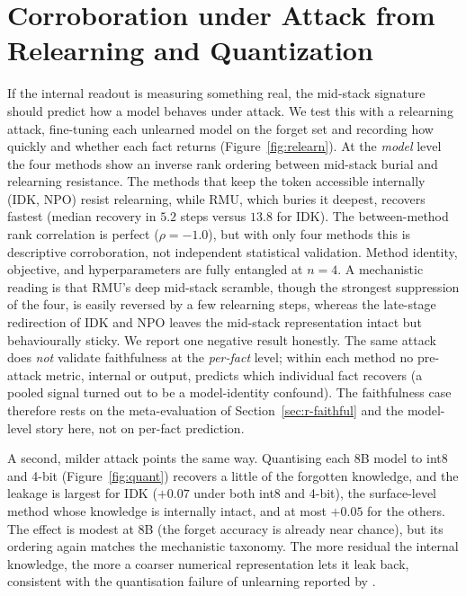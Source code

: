 \section{Corroboration under Attack from Relearning and Quantization}
\label{sec:r-attacks}

If the internal readout is measuring something real, the mid-stack signature should predict how a model
behaves under attack. We test this with a relearning attack, fine-tuning each unlearned model on the forget
set and recording how quickly and whether each fact returns (Figure~\ref{fig:relearn}). At the
\emph{model} level the four methods show an inverse rank ordering between mid-stack burial and relearning
resistance. The methods that keep the token accessible internally (IDK, NPO) resist relearning, while RMU,
which buries it deepest, recovers fastest (median recovery in $5.2$ steps versus $13.8$ for IDK). The
between-method rank correlation is perfect ($\rho = -1.0$), but with only four methods this is descriptive
corroboration, not independent statistical validation. Method identity, objective, and hyperparameters are
fully entangled at $n=4$. A mechanistic reading is that RMU's deep mid-stack scramble, though the strongest
suppression of the four, is easily reversed by a few relearning steps, whereas the late-stage redirection of
IDK and NPO leaves the mid-stack representation intact but behaviourally sticky. We report
one negative result honestly. The same attack does \emph{not} validate faithfulness at the \emph{per-fact}
level; within each method no pre-attack metric, internal or output, predicts which individual fact recovers
(a pooled signal turned out to be a model-identity confound). The faithfulness case therefore rests on the
meta-evaluation of Section~\ref{sec:r-faithful} and the model-level story here, not on per-fact prediction.

A second, milder attack points the same way. Quantising each 8B model to int8 and 4-bit
(Figure~\ref{fig:quant}) recovers a little of the forgotten knowledge, and the leakage is largest for IDK
($+0.07$ under both int8 and 4-bit), the surface-level method whose knowledge is internally intact, and at
most $+0.05$ for the others. The effect is modest at 8B (the forget accuracy is already near chance), but
its ordering again matches the mechanistic taxonomy. The more residual the internal knowledge, the more a
coarser numerical representation lets it leak back, consistent with the quantisation failure of unlearning
reported by \citet{zhang2024quantization}.

